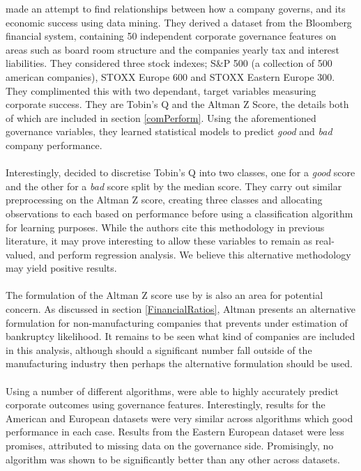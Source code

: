 {\cite{moldovan2015learning} made an attempt to find relationships between how a company governs, and its economic success using data mining. They derived a dataset from the Bloomberg financial system, containing 50 independent corporate governance features on areas such as board room structure and the  companies yearly tax and interest liabilities. They considered three stock indexes; S\&P 500 (a collection of 500 american companies), STOXX Europe 600 and STOXX Eastern Europe 300. They complimented this with two dependant, target variables measuring corporate success. They are Tobin's Q and the Altman Z Score, the details both of which are included in section \ref{comPerform}. Using the aforementioned governance variables, they learned statistical models to predict {\it good} and {\it bad} company performance.\\\\
Interestingly, \cite{moldovan2015learning} decided to discretise Tobin's Q into two classes, one for a {\it good} score and the other for a {\it bad} score split by the median score. They carry out similar preprocessing on the Altman Z score, creating three classes and allocating observations to each based on performance before using a classification algorithm for learning purposes. While the authors cite this methodology in previous literature, it may prove interesting to allow these variables to remain as real-valued, and perform regression analysis. We believe this alternative methodology may yield positive results. \\\\
The formulation of the Altman Z score use by \cite{moldovan2015learning} is also an area for potential concern. As discussed in section \ref{FinancialRatios}, Altman presents an alternative formulation for non-manufacturing companies that prevents under estimation of bankruptcy likelihood. It remains to be seen what kind of companies are included in this analysis, although should a significant number fall outside of the manufacturing industry then perhaps the alternative formulation should be used.   \\\\
Using a number of different algorithms, \cite{moldovan2015learning} were able to highly accurately predict corporate outcomes using governance features. Interestingly, results for the American and European datasets were very similar across algorithms which good performance in each case. Results from the Eastern European dataset were less promises, attributed to missing data on the governance side. Promisingly, no algorithm was shown to be significantly better than any other across datasets. \\\\
}
